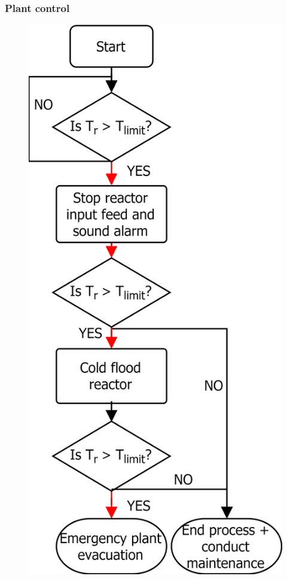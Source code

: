 \documentclass[11pt, a4paper]{article}
\begin{document}
{\subsubsection{Plant control}
\begin{figure}
	\centering
		\includegraphics[width=1\textwidth]{control.png}

\end{figure}}
\end{document}
